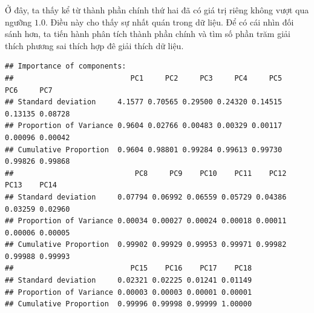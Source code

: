 \documentclass[../thesis.tex]{subfiles}
\begin{document}
Ở đây, ta thấy kể từ thành phần chính thứ hai đã có giá trị riêng không vượt qua ngưỡng $ 1.0 $. Điều này cho thấy sự nhất quán trong dữ liệu. Để có cái nhìn đối sánh hơn, ta tiến hành phân tích thành phần chính và tìm số phần trăm giải thích phương sai thích hợp đê giải thích dữ liệu.



\newpage
\begin{Shaded}
	\begin{Highlighting}[]
  \NormalTok{, } \NormalTok{) }\SpecialCharTok{\%\textgreater{}\%} 
		\NormalTok{()}
	\end{Highlighting}
\end{Shaded}

\begin{verbatim}
## Importance of components:
##                           PC1     PC2     PC3     PC4     PC5     PC6     PC7
## Standard deviation     4.1577 0.70565 0.29500 0.24320 0.14515 0.13135 0.08728
## Proportion of Variance 0.9604 0.02766 0.00483 0.00329 0.00117 0.00096 0.00042
## Cumulative Proportion  0.9604 0.98801 0.99284 0.99613 0.99730 0.99826 0.99868
##                            PC8     PC9    PC10    PC11    PC12    PC13    PC14
## Standard deviation     0.07794 0.06992 0.06559 0.05729 0.04386 0.03259 0.02960
## Proportion of Variance 0.00034 0.00027 0.00024 0.00018 0.00011 0.00006 0.00005
## Cumulative Proportion  0.99902 0.99929 0.99953 0.99971 0.99982 0.99988 0.99993
##                           PC15    PC16    PC17    PC18
## Standard deviation     0.02321 0.02225 0.01241 0.01149
## Proportion of Variance 0.00003 0.00003 0.00001 0.00001
## Cumulative Proportion  0.99996 0.99998 0.99999 1.00000
\end{verbatim}



\begin{Shaded}
	\begin{Highlighting}[]
 \NormalTok{) }\SpecialCharTok{\%\textgreater{}\%} 
		\NormalTok{()}
	\end{Highlighting}
\end{Shaded}
\end{document}

